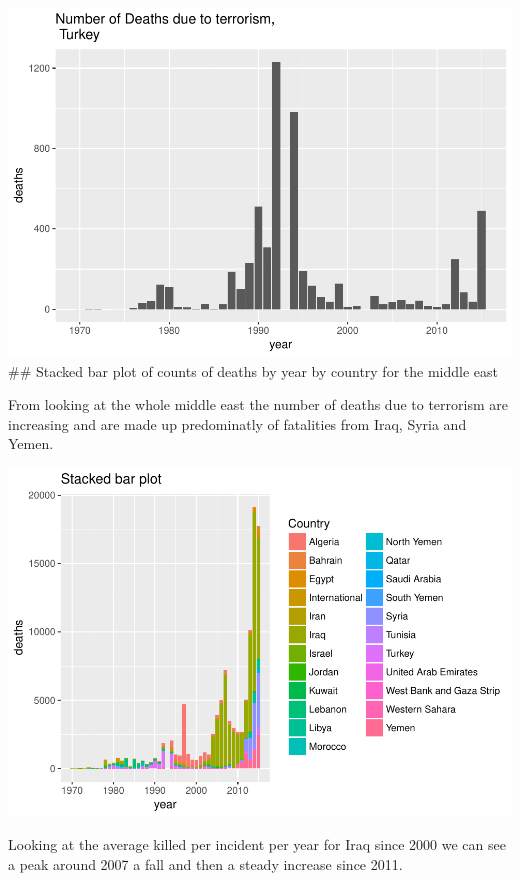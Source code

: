 \documentclass[]{article}
\begin{document}
\includegraphics{Peters_experiment_markdown_files/figure-latex/unnamed-chunk-14-1.pdf}
\#\# Stacked bar plot of counts of deaths by year by country for the
middle east

From looking at the whole middle east the number of deaths due to
terrorism are increasing and are made up predominatly of fatalities from
Iraq, Syria and Yemen.

\includegraphics{Peters_experiment_markdown_files/figure-latex/unnamed-chunk-15-1.pdf}

Looking at the average killed per incident per year for Iraq since 2000
we can see a peak around 2007 a fall and then a steady increase since
2011.
\end{document}
